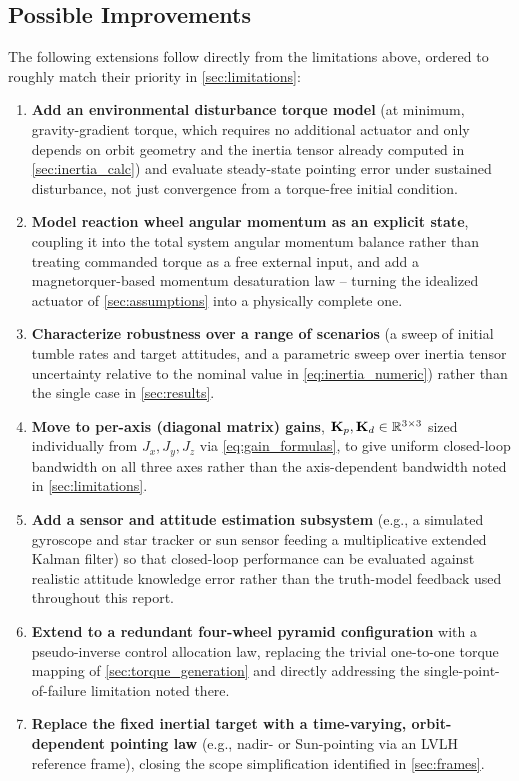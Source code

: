 \subsection{Possible Improvements}
\label{sec:improvements}

The following extensions follow directly from the limitations above, ordered to roughly match their priority in \cref{sec:limitations}:

\begin{enumerate}
    \item \textbf{Add an environmental disturbance torque model} (at minimum, gravity-gradient torque, which requires no additional actuator and only depends on orbit geometry and the inertia tensor already computed in \cref{sec:inertia_calc}) and evaluate steady-state pointing error under sustained disturbance, not just convergence from a torque-free initial condition.
    \item \textbf{Model reaction wheel angular momentum as an explicit state}, coupling it into the total system angular momentum balance rather than treating commanded torque as a free external input, and add a magnetorquer-based momentum desaturation law -- turning the idealized actuator of \cref{sec:assumptions} into a physically complete one.
    \item \textbf{Characterize robustness over a range of scenarios} (a sweep of initial tumble rates and target attitudes, and a parametric sweep over inertia tensor uncertainty relative to the nominal value in \cref{eq:inertia_numeric}) rather than the single case in \cref{sec:results}.
    \item \textbf{Move to per-axis (diagonal matrix) gains}, $\mathbf{K}_p,\mathbf{K}_d\in\mathbb{R}^{3\times3}$ sized individually from $J_x,J_y,J_z$ via \cref{eq:gain_formulas}, to give uniform closed-loop bandwidth on all three axes rather than the axis-dependent bandwidth noted in \cref{sec:limitations}.
    \item \textbf{Add a sensor and attitude estimation subsystem} (e.g., a simulated gyroscope and star tracker or sun sensor feeding a multiplicative extended Kalman filter) so that closed-loop performance can be evaluated against realistic attitude knowledge error rather than the truth-model feedback used throughout this report.
    \item \textbf{Extend to a redundant four-wheel pyramid configuration} with a pseudo-inverse control allocation law, replacing the trivial one-to-one torque mapping of \cref{sec:torque_generation} and directly addressing the single-point-of-failure limitation noted there.
    \item \textbf{Replace the fixed inertial target with a time-varying, orbit-dependent pointing law} (e.g., nadir- or Sun-pointing via an LVLH reference frame), closing the scope simplification identified in \cref{sec:frames}.
\end{enumerate}
